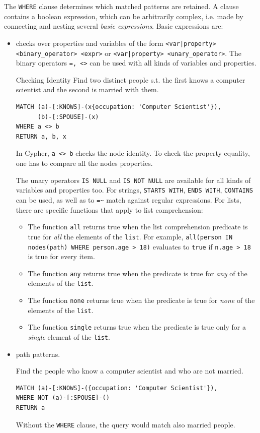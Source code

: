 The \texttt{WHERE} clause determines which matched patterns are retained. A  clause contains a boolean expression, which can be arbitrarily complex, i.e. made by connecting and nesting several \emph{basic expressions}. 
Basic expressions are: 
\begin{itemize}
    \item checks over properties and variables of the form \texttt{<var|property> <binary\_operator> <expr>} or \texttt{<var|property> <unary\_operator>}. The binary operators \texttt{=, <>} can be used with all kinds of variables and properties.
        \begin{example}{Checking Identity}
            Find two distinct people s.t. the first knows a computer scientist and the second is married with them.
            \begin{lstlisting}
MATCH (a)-[:KNOWS]-(x{occupation: 'Computer Scientist'}),
      (b)-[:SPOUSE]-(x)
WHERE a <> b
RETURN a, b, x
            \end{lstlisting}
            In Cypher, \texttt{a <> b} checks the node identity. To check the property equality, one has to compare all the nodes properties.
        \end{example}
        The unary operators \texttt{IS NULL} and \texttt{IS NOT NULL} are available for all kinds of variables and properties too.
        For strings, \texttt{STARTS WITH}, \texttt{ENDS WITH}, \texttt{CONTAINS} can be used, as well as to \texttt{=\~} match against regular expressions.
        For lists, there are specific functions that apply to list comprehension: 
        \begin{itemize}
            \item The function \texttt{all} returns true when the list comprehension predicate is true for \emph{all} the elements of the \texttt{list}. For example, \texttt{all(person IN nodes(path) WHERE person.age > 18)} evaluates to \texttt{true} if \texttt{n.age > 18} is true for every item.
            \item The function \texttt{any} returns true when the predicate is true for \emph{any} of the elements of the \texttt{list}.
            \item The function \texttt{none} returns true when the predicate is true for \emph{none} of the elements of the \texttt{list}.
            \item The function \texttt{single} returns true when the predicate is true only for a \emph{single} element of the \texttt{list}.
        \end{itemize}
    \item path patterns.
        \begin{example}{}
            Find the people who know a computer scientist and who are not married.
            \begin{lstlisting}
MATCH (a)-[:KNOWS]-({occupation: 'Computer Scientist'}),
WHERE NOT (a)-[:SPOUSE]-()
RETURN a
            \end{lstlisting}
            Without the \texttt{WHERE} clause, the query would match also married people.
        \end{example}
\end{itemize}

